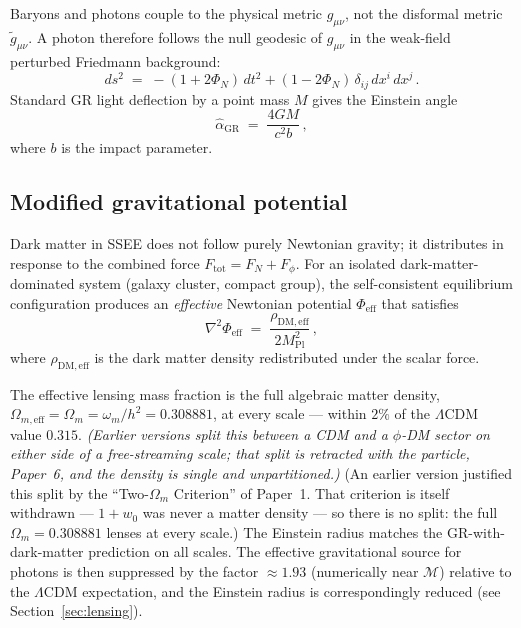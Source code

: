 \documentclass[12pt,a4paper]{article}
\newcommand{\MIRA}{\mathcal{M}}
\newcommand{\Mpl}{M_{\mathrm{Pl}}}
\newcommand{\hatalf}{\hat{\alpha}}
\begin{document}
Baryons and photons couple to the physical metric $g_{\mu\nu}$, not the
disformal metric $\tilde{g}_{\mu\nu}$.
A photon therefore follows the null geodesic of $g_{\mu\nu}$ in the weak-field
perturbed Friedmann background:
\begin{equation}
  ds^2 \;=\; -(1+2\Phi_N)\,dt^2 + (1-2\Phi_N)\,\delta_{ij}\,dx^i\,dx^j\,.
  \label{eq:metric_wf}
\end{equation}
Standard GR light deflection by a point mass $M$ gives the Einstein angle
\begin{equation}
  \hatalf_{\mathrm{GR}} \;=\; \frac{4GM}{c^2 b}\,,
  \label{eq:alpha_GR}
\end{equation}
where $b$ is the impact parameter.

\subsection{Modified gravitational potential}

Dark matter in SSEE does not follow purely Newtonian gravity; it distributes
in response to the combined force $F_{\mathrm{tot}} = F_N + F_\phi$.
For an isolated dark-matter-dominated system (galaxy cluster, compact
group), the self-consistent equilibrium configuration produces an
\emph{effective} Newtonian potential $\Phi_{\mathrm{eff}}$ that satisfies
\begin{equation}
  \nabla^2\Phi_{\mathrm{eff}} \;=\;
      \frac{\rho_{\mathrm{DM,eff}}}{2\Mpl^2}\,,
  \label{eq:phi_eff}
\end{equation}
where $\rho_{\mathrm{DM,eff}}$ is the dark matter density redistributed
under the scalar force.

The effective lensing mass fraction is the full algebraic matter density,
$\Omega_{m,\mathrm{eff}} = \Omega_m = \omega_m/h^2 = 0.308881$, at every
scale --- within $2\%$ of the $\Lambda$CDM value $0.315$. \emph{(Earlier
versions split this between a CDM and a $\phi$-DM sector on either side of a
free-streaming scale; that split is retracted with the particle, Paper~6, and
the density is single and unpartitioned.)}
(An earlier version justified this split by the ``Two-$\Omega_m$ Criterion''
of Paper~1. That criterion is itself withdrawn --- $1+w_0$ was never a matter
density --- so there is no split: the full $\Omega_m=0.308881$ lenses at every
scale.)
The Einstein radius matches the GR-with-dark-matter prediction on all scales.
The effective gravitational source for photons is then suppressed by the
factor $\approx1.93$ (numerically near $\MIRA$) relative to the $\Lambda$CDM expectation, and
the Einstein radius is correspondingly reduced (see
Section~\ref{sec:lensing}).
\end{document}
